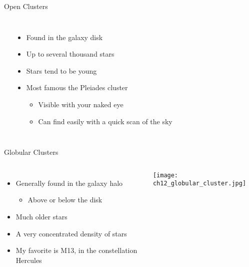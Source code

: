 \documentclass[pdf, aspectratio=169]{beamer}
\begin{document}
\begin{frame}{Open Clusters}
  \begin{columns}
	\begin{center}
	\end{center}
	\begin{itemize}
	  \item Found in the galaxy disk
	  \item Up to several thousand stars
	  \item Stars tend to be young
	  \item Most famous the Pleiades cluster
		\begin{itemize}
		  \item Visible with your naked eye
		  \item Can find easily with a quick scan of the sky
		\end{itemize}
	\end{itemize}
  \end{columns}
\end{frame}

\begin{frame}{Globular Clusters}
  \begin{columns}
	\begin{itemize}
	  \item Generally found in the galaxy halo
		\begin{itemize}
		  \item Above or below the disk
		\end{itemize}
	  \item Much older stars
	  \item A very concentrated density of stars
	  \item My favorite is M13, in the constellation Hercules
	\end{itemize}
	\begin{center}
	  \texttt{[image: ch12\_globular\_cluster.jpg]}
	\end{center}
  \end{columns}
\end{frame}
\end{document}
